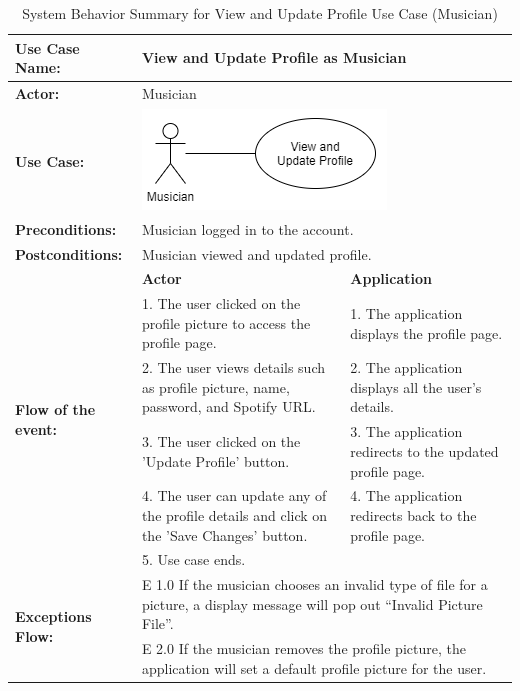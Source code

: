 \begin{longtable}{|p{3cm}|p{5cm}|p{5cm}|}
    \caption{\centering System Behavior Summary for View and Update Profile Use Case (Musician)} \\
    \hline
    \textbf{Use Case Name:} & \multicolumn{2}{l|}{View and Update Profile as Musician} \\ \hline
    \textbf{Actor:} & \multicolumn{2}{l|}{Musician} \\ \hline
    \textbf{Use Case:} & \multicolumn{2}{l|}{\includegraphics[width=0.5\linewidth]{mainmatter/images/sucd3.png}} \\ \hline
    \textbf{Preconditions:} & \multicolumn{2}{p{10cm}|}{Musician logged in to the account.} \\ \hline
    \textbf{Postconditions:} & \multicolumn{2}{p{10cm}|}{Musician viewed and updated profile.} \\ \hline
    \multirow{6}{3cm}{\raggedright \textbf{Flow of the event:}} & \textbf{Actor} & \textbf{Application} \\ \cline{2-3}
    & 1. The user clicked on the profile picture to access the profile page. & 1. The application displays the profile page. \\ \cline{2-3}
    & 2. The user views details such as profile picture, name, password, and Spotify URL. & 2. The application displays all the user's details.  \\ \cline{2-3}
    & 3. The user clicked on the 'Update Profile' button. & 3. The application redirects to the updated profile page.  \\ \cline{2-3}
    & 4. The user can update any of the profile details and click on the 'Save Changes' button. & 4. The application redirects back to the profile page. \\ \cline{2-3}
    & 5. Use case ends. & \\ \hline
    \multirow{2}{3cm}{\raggedright \textbf{Exceptions Flow:}} & \multicolumn{2}{p{10cm}|}{\raggedright E 1.0 If the musician chooses an invalid type of file for a picture, a display message will pop out “Invalid Picture File”.} \\ \cline{2-3}
    & \multicolumn{2}{p{10cm}|}{\raggedright E 2.0 If the musician removes the profile picture, the application will set a default profile picture for the user.} \\ \hline
\end{longtable}
\pagebreak

